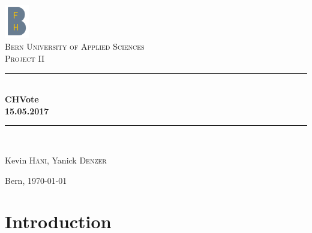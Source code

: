 \documentclass[a4paper,12pt]{report}
\theoremstyle{definition}
\begin{document}
\pagestyle{empty} %
\begin{titlepage}
\begin{center}

\includegraphics[width=0.08\textwidth]{images/bfh_logo.png}\\[1cm]    
\textsc{\LARGE Bern University of Applied Sciences}\\[1.5cm]
\textsc{\Large Project II}\\[0.5cm]

\newcommand{\HRule}{\rule{\linewidth}{0.3mm}}
\HRule \\[0.4cm]
{\huge \bfseries CHVote}\\[0.3cm]
{\bfseries 15.05.2017}\\[0.2cm]
\HRule \\[1.5cm]

\begin{minipage}{0.4\textwidth}
\begin{flushleft} \large
Kevin \textsc{Häni}, Yanick \textsc{Denzer}
\end{flushleft}
\end{minipage}
\hfill
\begin{minipage}{0.4\textwidth}
\begin{flushright} \large

\end{flushright}
\end{minipage}
\vfill

Bern, {\large \today}
\end{center}
\end{titlepage}
\pagestyle {plain}

\chapter{Introduction}
\end{document}
